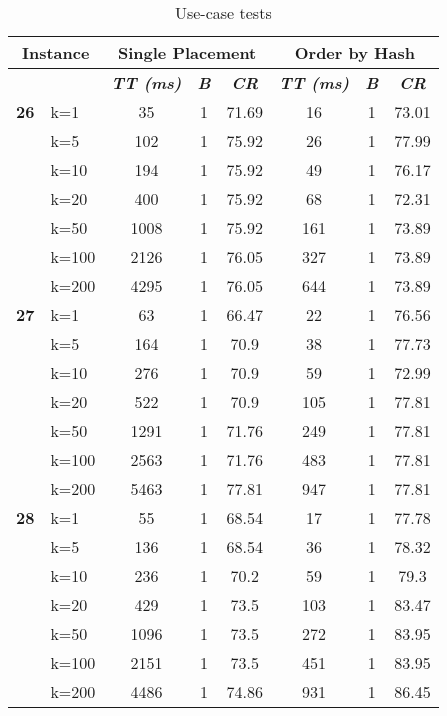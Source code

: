     \begin{table}[htbp]
    \caption{Use-case tests}
    \begin{tabular}{|l|l|c|c|c|c|c|c|}
    
    \multicolumn{ 2}{|c|}{\textbf{Instance}} & \multicolumn{ 3}{c|}{\textbf{Single Placement}} & \multicolumn{ 3}{c|}{\textbf{Order by Hash}} \\ \hline
    \multicolumn{ 2}{|l|}{} & \textbf{\textit{TT (ms)}} & \textbf{\textit{B}} & \textbf{\textit{CR}} & \textbf{\textit{TT (ms)}} & \textbf{\textit{B}} & \textbf{\textit{CR}} \\ \hline
    \multicolumn{1}{|r|}{\textbf{26}} & k=1 & 35 & 1 & 71.69 & 16 & 1 & 73.01 \\ 
     & k=5 & 102 & 1 & 75.92 & 26 & 1 & 77.99 \\ 
     & k=10 & 194 & 1 & 75.92 & 49 & 1 & 76.17 \\ 
     & k=20 & 400 & 1 & 75.92 & 68 & 1 & 72.31 \\ 
     & k=50 & 1008 & 1 & 75.92 & 161 & 1 & 73.89 \\ 
     & k=100 & 2126 & 1 & 76.05 & 327 & 1 & 73.89 \\ 
     & k=200 & 4295 & 1 & 76.05 & 644 & 1 & 73.89 \\ \hline
    \multicolumn{1}{|r|}{\textbf{27}} & k=1 & 63 & 1 & 66.47 & 22 & 1 & 76.56 \\ 
     & k=5 & 164 & 1 & 70.9 & 38 & 1 & 77.73 \\ 
     & k=10 & 276 & 1 & 70.9 & 59 & 1 & 72.99 \\ 
     & k=20 & 522 & 1 & 70.9 & 105 & 1 & 77.81 \\ 
     & k=50 & 1291 & 1 & 71.76 & 249 & 1 & 77.81 \\ 
     & k=100 & 2563 & 1 & 71.76 & 483 & 1 & 77.81 \\ 
     & k=200 & 5463 & 1 & 77.81 & 947 & 1 & 77.81 \\ \hline
    \multicolumn{1}{|r|}{\textbf{28}} & k=1 & 55 & 1 & 68.54 & 17 & 1 & 77.78 \\ 
     & k=5 & 136 & 1 & 68.54 & 36 & 1 & 78.32 \\ 
     & k=10 & 236 & 1 & 70.2 & 59 & 1 & 79.3 \\ 
     & k=20 & 429 & 1 & 73.5 & 103 & 1 & 83.47 \\ 
     & k=50 & 1096 & 1 & 73.5 & 272 & 1 & 83.95 \\ 
     & k=100 & 2151 & 1 & 73.5 & 451 & 1 & 83.95 \\ 
     & k=200 & 4486 & 1 & 74.86 & 931 & 1 & 86.45 \\ \hline

\end{tabular}
\end{table}
